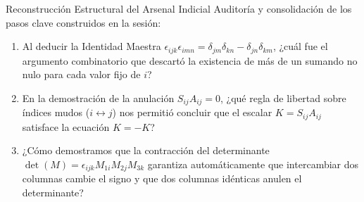 \documentclass[10pt,aspectratio=169]{beamer}
\begin{document}
\begin{frame}{Reconstrucción Estructural del Arsenal Indicial}
  \vspace{0.15cm}
  Auditoría y consolidación de los pasos clave construidos en la sesión:
  \vspace{0.3cm}
  \begin{enumerate}\itemsep14pt
    \item Al deducir la Identidad Maestra $\epsilon_{ijk}\epsilon_{imn} = \delta_{jm}\delta_{kn} - \delta_{jn}\delta_{km}$, ¿cuál fue el argumento combinatorio que descartó la existencia de más de un sumando no nulo para cada valor fijo de $i$?
    \item En la demostración de la anulación $S_{ij}A_{ij} = 0$, ¿qué regla de libertad sobre índices mudos ($i \leftrightarrow j$) nos permitió concluir que el escalar $K = S_{ij}A_{ij}$ satisface la ecuación $K = -K$?
    \item ¿Cómo demostramos que la contracción del determinante $\det(M) = \epsilon_{ijk} M_{1i} M_{2j} M_{3k}$ garantiza automáticamente que intercambiar dos columnas cambie el signo y que dos columnas idénticas anulen el determinante?
  \end{enumerate}
\end{frame}
\end{document}
